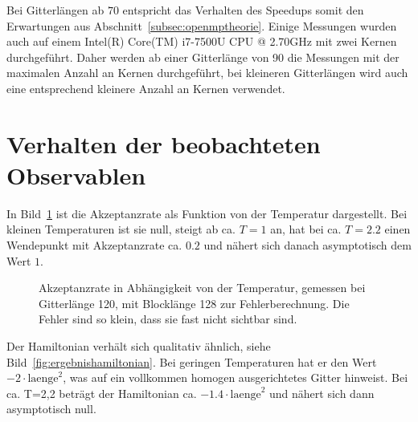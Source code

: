 	Bei Gitterlängen ab $70$ entspricht das Verhalten des Speedups somit den Erwartungen aus Abschnitt~\ref{subsec:openmptheorie}. Einige Messungen wurden auch auf einem Intel(R) Core(TM) i7-7500U CPU @ 2.70GHz mit zwei Kernen durchgeführt.
	Daher werden ab einer Gitterlänge von 90 die Messungen mit der maximalen Anzahl an Kernen durchgeführt, bei kleineren Gitterlängen wird auch eine entsprechend kleinere Anzahl an Kernen verwendet. 
	
	
	
	
	\section{Verhalten der beobachteten Observablen}
	\label{sec:ergebnisobservablen}
	
	In Bild~\ref{fig:ergebnisakzeptanzrate} ist die Akzeptanzrate als Funktion von der Temperatur dargestellt. Bei kleinen Temperaturen ist sie null, steigt ab ca. $T=1$ an, hat bei ca. $T=\num{2,2}$ einen Wendepunkt mit Akzeptanzrate ca. $\num{0,2}$ und nähert sich danach asymptotisch dem Wert $1$. 
	
	
	\begin{figure}[htbp]
		
		\caption[Akzeptanzrate in Abhängigkeit von der Temperatur]{Akzeptanzrate in Abhängigkeit von der Temperatur, gemessen bei Gitterlänge 120, mit Blocklänge 128 zur Fehlerberechnung. Die Fehler sind so klein, dass sie fast nicht sichtbar sind.}
		\label{fig:ergebnisakzeptanzrate}
	\end{figure}
	
	Der Hamiltonian verhält sich qualitativ ähnlich, siehe Bild~\ref{fig:ergebnishamiltonian}. Bei geringen Temperaturen hat er den Wert $-2\cdot\text{laenge}^2$, was auf ein vollkommen homogen ausgerichtetes Gitter hinweist. Bei ca.{} T=2,2 beträgt der Hamiltonian ca.{} $-\num{1,4}\cdot\text{laenge}^2$ und nähert sich dann asymptotisch null.
	

